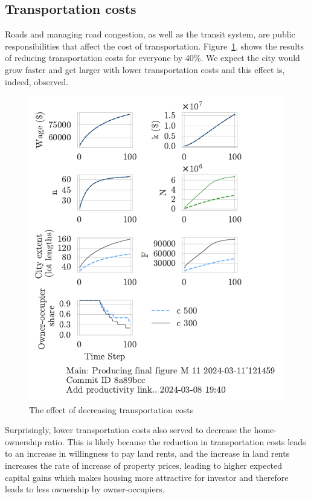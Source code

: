 \newpage
\subsection{Transportation costs}
Roads and managing road congestion, as well as the transit system, are public responsibilities that affect the cost of transportation. %
Figure~\ref{fig:c_ownership_trajectory}, shows the results of reducing transportation costs for everyone by 40\%. 
We expect the city would grow faster and get larger with lower transportation costs and this effect is, indeed, observed. 


\begin{figure}[h!b]
    \centering
    \includegraphics[scale=1, trim={0 1.4cm 0 0},clip]{fig/c-Main-121459.pdf}
    \caption{The effect of decreasing transportation costs}
    \label{fig:c_ownership_trajectory}
\end{figure}
Surprisingly, lower transportation costs also served to decrease the home-ownership ratio. This is likely because the reduction in transportation costs leads to an increase in willingness to pay land rents, and the increase in land rents increases the rate of increase of property prices, leading to higher expected capital gains which makes housing more attractive for investor and therefore leads to less ownership by owner-occupiers. 

